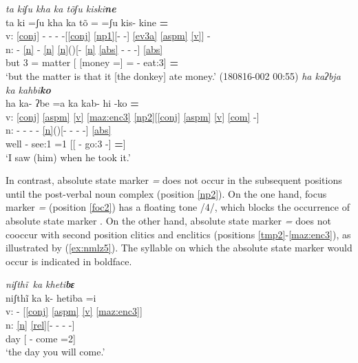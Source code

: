 \documentclass[output=paper]{langscibook}
\begin{document}
\ea \label{ex:nmlz1}
 \textit{ta\1\2 \st{}k\lab i\2ʃu\2 \st{}k\lab ha\4\1 \ssn ka\2 \st{}tõ\2\4\1ʃu\2 ki\4ski\2\textbf{\st{}ne\2\1}}\\
\gllll {} ta\1\2 k\lab{}i\2 =ʃu\3\ff{} k\lab ha\1 \ssn ka\2 tõ\2\4 =\1 =ʃu\3\ff{} ki\2s- ki\2ne\2 \textbf{=\1}\\
v: \ref{conj} - - - -[\ref{conj} \ref{np1}[- -] \ref{ev3a} \ref{aspm} \ref{v}] -  \\
n: - \ref{n} - \ref{n} \ref{n}(\Nmlz)[- \ref{n} \ref{abs} - - -] \ref{abs}\\
{} but \Pronom{}3 =\Rep{} matter [\Sub{} [money =\Abst{}] =\Rep{} \Pfv- eat:3] \textbf{=\Abst}\\
\glt `but the matter is that it [the donkey] ate money.'  (180816-002 00:55)
\ex \label{ex:nmlz2}
 \textit{ha\1 ka\2\st{}ʔbja\2\3\1 \ssn ka\2 ka\2hbi\2\textbf{\st{}ko\1\3\1}}\\
\gllll {} ha\1 ka\2- ʔbe\2\3 =a\1 \ssn ka\2 ka\2b- hi\2 -ko\1\3 \textbf{=\1}\\
v: \ref{conj} \ref{aspm} \ref{v} \ref{maz:enc3} \ref{np2}[\ref{conj} \ref{aspm} \ref{v} \ref{com} -]\\
n: - - - - \ref{n}(\Nmlz)[- - - -] \ref{abs}\\
{} well \Pst- see:1 =1\Sg{} [[\Sub{} \Pst- go:3 -\Com{}]  \textbf{=\Abst}]\\
\glt `I saw (him) when he took it.'  \citep[249]{nakamoto20}
\z


In contrast, absolute state marker \textit{=\1} does not occur in the subsequent positions until the post-verbal noun complex (position \ref{np2}). On the one hand, focus marker \textit{=\3\ff} (position \ref{foc2}) has a floating tone /4/, which blocks the occurrence of absolute state marker \citep[248--250]{nakamoto20}. On the other hand, absolute state marker \textit{=\1} does not cooccur with second position clitics and enclitics (positions \ref{tmp2}-\ref{maz:enc3}), as illustrated by (\ref{ex:nmlz5}). The syllable on which the absolute state marker would occur is indicated in boldface.

\ea \label{ex:nmlz5}
 \textit{ni\2\st{}ʃthĩ\2\3\ \ssn ka\2 k\lab he\1\ssn ti\2\textbf{\st{}bɛ\4}}\\
\gllll {} ni\2ʃthĩ\2\3 \ssn ka\2 k\lab-  he\1\ssn ti\2ba\4 =i\\
v: - \Nmlz{}[\ref{conj} \ref{aspm} \ref{v} \ref{maz:enc3}]\\
n: \ref{n} \ref{rel}[- - - -]\\
{} day [\Sub{} \Pot- come =2\Sg]\\
\glt `the day you will come.' \citep[245]{nakamoto20}
\z
\end{document}
